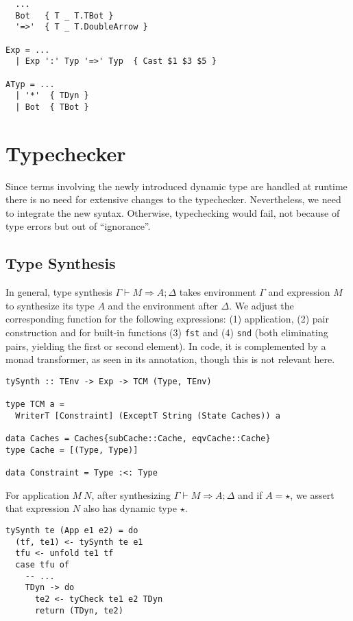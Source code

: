 \begin{lstlisting}[caption=Extensions to \texttt{Parsing/Grammar.y}]
%token
  ...
  Bot   { T _ T.TBot }
  '=>'  { T _ T.DoubleArrow }

Exp = ...
  | Exp ':' Typ '=>' Typ  { Cast $1 $3 $5 }

ATyp = ...
  | '*'  { TDyn }
  | Bot  { TBot }
\end{lstlisting}

\section{Typechecker}

Since terms involving the newly introduced dynamic type are handled at runtime there is no need for extensive changes to the typechecker. Nevertheless, we need to integrate the new syntax. Otherwise, typechecking would fail, not because of type errors but out of ``ignorance''.

\subsection{Type Synthesis}

In general, type synthesis $\Gamma \vdash M \Rightarrow A;\Delta$ takes environment $\Gamma$ and expression $M$ to synthesize its type $A$ and the environment after $\Delta$. We adjust the corresponding function for the following expressions: (1) application, (2) pair construction and for built-in functions (3) \texttt{fst} and (4) \texttt{snd} (both eliminating pairs, yielding the first or second element). In code, it is complemented by a monad transformer, as seen in its annotation, though this is not relevant here.

\begin{lstlisting}[caption=\texttt{tySynth} function type annotation]
tySynth :: TEnv -> Exp -> TCM (Type, TEnv)

type TCM a =
  WriterT [Constraint] (ExceptT String (State Caches)) a

data Caches = Caches{subCache::Cache, eqvCache::Cache}
type Cache = [(Type, Type)]

data Constraint = Type :<: Type
\end{lstlisting}

For application $M~N$, after synthesizing $\Gamma \vdash M \Rightarrow A;\Delta$ and if $A = \star$, we assert that expression $N$ also has dynamic type $\star$.

\begin{lstlisting}[caption=Application type synthesis (\texttt{TCTyping.hs})]
tySynth te (App e1 e2) = do
  (tf, te1) <- tySynth te e1
  tfu <- unfold te1 tf
  case tfu of
    -- ...
    TDyn -> do
      te2 <- tyCheck te1 e2 TDyn
      return (TDyn, te2)
\end{lstlisting}


